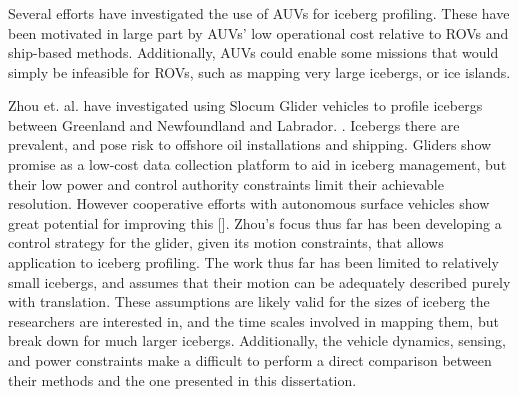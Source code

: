 \subsubsection{}

Several efforts have investigated the use of AUVs for iceberg profiling. These have been motivated in large part by AUVs' low operational cost relative to ROVs and ship-based methods. Additionally, AUVs could enable some missions that would simply be infeasible for ROVs, such as mapping very large icebergs, or ice islands. 

Zhou et. al. have investigated using Slocum Glider vehicles to profile icebergs between Greenland and Newfoundland and Labrador. \cite{Zhou2014}. Icebergs there are prevalent, and pose risk to offshore oil installations and shipping. Gliders show promise as a low-cost data collection platform to aid in iceberg management, but their low power and control authority constraints limit their achievable resolution. However cooperative efforts with autonomous surface vehicles show great potential for improving this [\cite{}]. Zhou's focus thus far has been developing a control strategy for the glider, given its motion constraints, that allows application to iceberg profiling. The work thus far has been limited to relatively small icebergs, and assumes that their motion can be adequately described purely with translation. These assumptions are likely valid for the sizes of iceberg the researchers are interested in, and the time scales involved in mapping them, but break down for much larger icebergs. Additionally, the vehicle dynamics, sensing, and power constraints make a difficult to perform a direct comparison between their methods and the one presented in this dissertation. 

